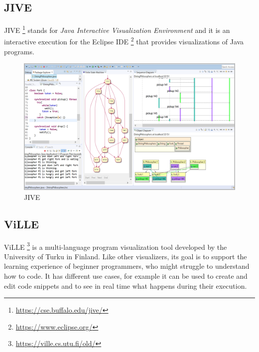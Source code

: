 \documentclass[]{usiinfbachelorproject}
\begin{document}
\subsection{JIVE}

JIVE \footnote{\url{https://cse.buffalo.edu/jive/}} stands for \emph{Java Interactive Visualization Environment} and it is an interactive execution for the Eclipse IDE \footnote{\url{https://www.eclipse.org/}} that provides visualizations of Java programs.

\begin{figure}[h!]
\centering
\includegraphics[width=\textwidth]{figures/jive.png}
\caption {JIVE}
\end{figure}

\subsection{ViLLE}

ViLLE \footnote{\url{https://ville.cs.utu.fi/old/}} is a multi-language program visualization tool developed by the University of Turku in Finland. Like other visualizers, its goal is to support the learning experience of beginner programmers, who might struggle to understand how to code. It has different use cases, for example it can be used to create and edit code snippets and to see in real time what happens during their execution.
\end{document}
